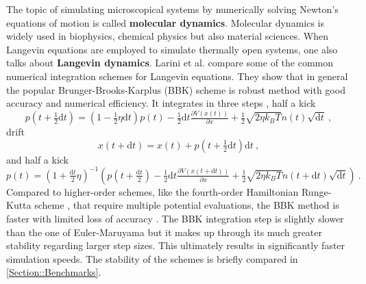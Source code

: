 	The topic of simulating microscopical systems by numerically solving Newton's equations of motion is called \textbf{molecular dynamics}. Molecular dynamics is widely used in biophysics, chemical physics but also material sciences. When Langevin equations are employed to simulate thermally open systems, one also talks about \textbf{Langevin dynamics}. Larini et al. \cite{larini2007langevin} compare some of the common numerical integration schemes for Langevin equations. They show that in general the popular Brunger-Brooks-Karplus (BBK) \cite{brunger1984stochastic} scheme is robust method with good accuracy and numerical efficiency. It integrates in three steps \cite{izaguirre2001langevin}, half a kick
	\begin{equation}
		p\left(t + \tfrac{1}{2} \text{d}t \right) =	\left(1 - \tfrac{1}{2} \eta \text{d}t \right) p(t) - \tfrac{1}{2} \text{d}t \tfrac{\partial V(x(t))}{\partial x} + \tfrac{1}{2} \sqrt{2\eta{k_B T}} n(t) \sqrt{\text{d}t}~,
	\end{equation}
	drift
	\begin{equation}
		x(t + \text{d}t) = x(t) +  p\left(t + \tfrac{1}{2} \text{d}t\right) \text{d}t~,
	\end{equation}
	and half a kick
	\begin{equation}
		p\left(t\right) =	\left(1 + \tfrac{\text{d}t}{2} \eta \right)^{-1} \left( p\left(t + \tfrac{\text{d}t}{2}\right) - \tfrac{1}{2} \text{d}t \tfrac{\partial V(x(t + \text{d}t))}{\partial x} + \tfrac{1}{2} \sqrt{2\eta{k_B T}} n({t + \text{d}t}) \sqrt{\text{d}t} \right) ~.
	\end{equation}
	Compared to higher-order schemes, like the fourth-order Hamiltonian Runge-Kutta scheme \cite{press2002numerical}, that require multiple potential evaluations, the BBK method is faster with limited loss of accuracy \cite{larini2007langevin}. The BBK integration step is slightly slower than the one of Euler-Maruyama but it makes up through its much greater stability regarding larger step sizes. This ultimately results in significantly faster simulation speeds. The stability of the schemes is briefly compared in \autoref{Section::Benchmarks}. \\
	
